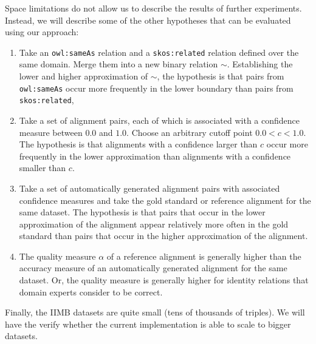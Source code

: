 Space limitations do not allow us to describe the results of further
  experiments. Instead, we will describe some of the other hypotheses
  that can be evaluated using our approach:
\begin{enumerate}
\item Take an {\small \texttt{owl:sameAs}} relation and
        a {\small \texttt{skos:related}}
        relation defined over the same domain.
      Merge them into a new binary relation $\sim$.
      Establishing the lower and higher approximation of $\sim$,
        the hypothesis is that pairs from {\small \texttt{owl:sameAs}}
        occur more frequently in the lower boundary than pairs from
        {\small \texttt{skos:related}},
\item Take a set of alignment pairs, each of which is associated with
        a confidence measure between $0.0$ and $1.0$.
      Choose an arbitrary cutoff point $0.0 < c < 1.0$.
      The hypothesis is that alignments with a confidence larger than $c$
        occur more frequently in the lower approximation than alignments
        with a confidence smaller than $c$.
\item Take a set of automatically generated alignment pairs with
        associated confidence measures and take the gold standard or
        reference alignment for the same dataset.
      The hypothesis is that pairs that occur in the lower approximation
        of the alignment appear relatively more often in the gold standard
        than pairs that occur in the higher approximation of the alignment.
\item The quality measure $\alpha$ of a reference alignment is generally
        higher than the accuracy measure of an automatically generated
        alignment for the same dataset.
      Or, the quality measure is generally higher for identity relations
        that domain experts consider to be correct.
\end{enumerate}

\noindent Finally, the IIMB datasets are quite small
  (tens of thousands of triples).
We will have the verify whether the current implementation is able to scale
  to bigger datasets.
